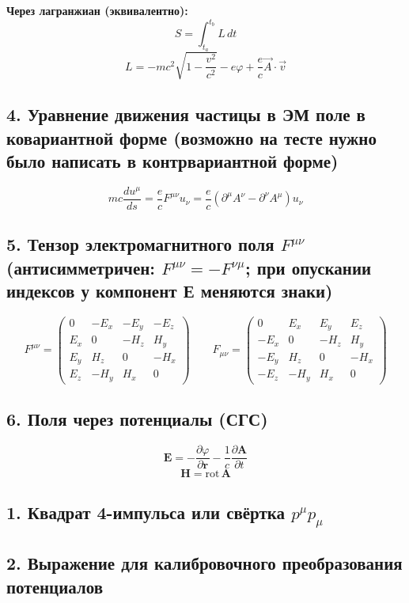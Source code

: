 \documentclass[10pt]{article}
\begin{document}
\textbf{Через лагранжиан (эквивалентно):}
$$S = \int_{t_a}^{t_b} L\, dt$$
$$L = -mc^2\sqrt{1-\frac{v^2}{c^2}} - e\varphi + \frac{e}{c}\vec{A}\cdot\vec{v}$$


\subsection*{4. Уравнение движения частицы в ЭМ поле в ковариантной форме (возможно на тесте нужно было написать в контрвариантной форме)}
$$mc\frac{du^\mu}{ds} = \frac{e}{c}F^{\mu\nu}u_\nu = \frac{e}{c}\left(\partial^\mu A^\nu - \partial^\nu A^\mu\right)u_\nu$$

\subsection*{5. Тензор электромагнитного поля $F^{\mu\nu}$ (антисимметричен: $F^{\mu\nu} = -F^{\nu\mu}$; при опускании индексов у компонент Е меняются знаки)}
$$F^{\mu\nu} = \begin{pmatrix} 0 & -E_x & -E_y & -E_z \\ E_x & 0 & -H_z & H_y \\ E_y & H_z & 0 & -H_x \\ E_z & -H_y & H_x & 0 \end{pmatrix} \qquad F_{\mu\nu} = \begin{pmatrix} 0 & E_x & E_y & E_z \\ -E_x & 0 & -H_z & H_y \\ -E_y & H_z & 0 & -H_x \\ -E_z & -H_y & H_x & 0 \end{pmatrix}$$

\subsection*{6. Поля через потенциалы (СГС)}
$$\mathbf{E} = -\frac{\partial\varphi}{\partial\mathbf{r}} - \frac{1}{c}\frac{\partial\mathbf{A}}{\partial t}$$
$$\mathbf{H} = \text{rot}\,\mathbf{A} $$


\newpage

\subsection*{1. Квадрат 4-импульса или свёртка $p^\mu p_\mu$}
\subsection*{2. Выражение для калибровочного преобразования потенциалов}
\end{document}
